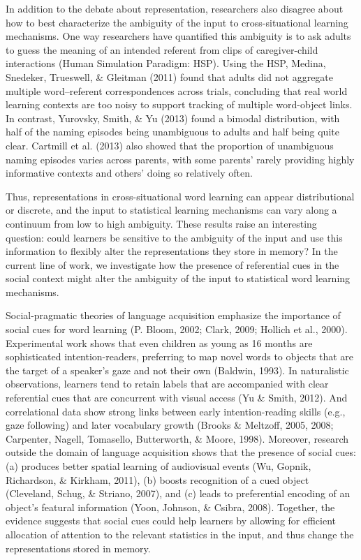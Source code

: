 \documentclass[authoryear, review]{elsarticle}
\begin{document}
In addition to the debate about representation, researchers also
disagree about how to best characterize the ambiguity of the input to
cross-situational learning mechanisms. One way researchers have
quantified this ambiguity is to ask adults to guess the meaning of an
intended referent from clips of caregiver-child interactions (Human
Simulation Paradigm: HSP). Using the HSP, Medina, Snedeker, Trueswell,
\& Gleitman (2011) found that adults did not aggregate multiple
word--referent correspondences across trials, concluding that real world
learning contexts are too noisy to support tracking of multiple
word-object links. In contrast, Yurovsky, Smith, \& Yu (2013) found a
bimodal distribution, with half of the naming episodes being unambiguous
to adults and half being quite clear. Cartmill et al. (2013) also showed
that the proportion of unambiguous naming episodes varies across
parents, with some parents' rarely providing highly informative contexts
and others' doing so relatively often.

Thus, representations in cross-situational word learning can appear
distributional or discrete, and the input to statistical learning
mechanisms can vary along a continuum from low to high ambiguity. These
results raise an interesting question: could learners be sensitive to
the ambiguity of the input and use this information to flexibly alter
the representations they store in memory? In the current line of work,
we investigate how the presence of referential cues in the social
context might alter the ambiguity of the input to statistical word
learning mechanisms.

Social-pragmatic theories of language acquisition emphasize the
importance of social cues for word learning (P. Bloom, 2002; Clark,
2009; Hollich et al., 2000). Experimental work shows that even children
as young as 16 months are sophisticated intention-readers, preferring to
map novel words to objects that are the target of a speaker's gaze and
not their own (Baldwin, 1993). In naturalistic observations, learners
tend to retain labels that are accompanied with clear referential cues
that are concurrent with visual access (Yu \& Smith, 2012). And
correlational data show strong links between early intention-reading
skills (e.g., gaze following) and later vocabulary growth (Brooks \&
Meltzoff, 2005, 2008; Carpenter, Nagell, Tomasello, Butterworth, \&
Moore, 1998). Moreover, research outside the domain of language
acquisition shows that the presence of social cues: (a) produces better
spatial learning of audiovisual events (Wu, Gopnik, Richardson, \&
Kirkham, 2011), (b) boosts recognition of a cued object (Cleveland,
Schug, \& Striano, 2007), and (c) leads to preferential encoding of an
object's featural information (Yoon, Johnson, \& Csibra, 2008).
Together, the evidence suggests that social cues could help learners by
allowing for efficient allocation of attention to the relevant
statistics in the input, and thus change the representations stored in
memory.
\end{document}

